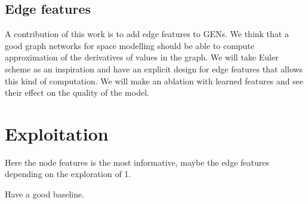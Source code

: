 \documentclass[a4paper,10pt]{article}
\newcommand{\ap}[1]{\marginpar{{\tiny \color{purple} [AP] #1}}}
\begin{document}
\subsection{Edge features}
A contribution of this work is to add edge features to GENs. We think that a good graph networks for space modelling should be able to compute approximation of the derivatives of values in the graph. We will take Euler scheme as an inspiration and have an explicit design for edge features that allows this kind of computation. We will make an ablation with learned features and see their effect on the quality of the model.
\ap{TODO: sketch}



\section{Exploitation}


Here the node features is the most informative, maybe the edge features depending on the exploration of 1.


Have a good baseline.


\end{document}
